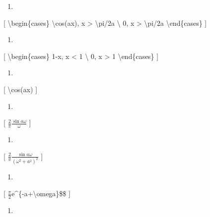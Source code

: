 \documentclass[
]{article}
\providecommand{\tightlist}{%
  \setlength{\itemsep}{0pt}\setlength{\parskip}{0pt}}
\begin{document}
{{{\begin{enumerate}
\def\labelenumi{\arabic{enumi}.}
\setcounter{enumi}{16}
\tightlist
\item
\end{enumerate}

{[} \textbackslash begin\{cases\} \textbackslash cos(ax),
\textbar x\textbar{} \textgreater{} \textbackslash pi/2a
\textbackslash{} 0, \textbar x\textbar{} \textgreater{}
\textbackslash pi/2a \textbackslash end\{cases\} {]}

\begin{enumerate}
\def\labelenumi{\arabic{enumi}.}
\setcounter{enumi}{17}
\tightlist
\item
\end{enumerate}

{[} \textbackslash begin\{cases\} 1-\textbar x\textbar,
\textbar x\textbar{} \textless{} 1 \textbackslash{} 0,
\textbar x\textbar{} \textgreater{} 1 \textbackslash end\{cases\} {]}

\begin{enumerate}
\def\labelenumi{\arabic{enumi}.}
\setcounter{enumi}{18}
\tightlist
\item
\end{enumerate}

{[} \textbackslash cos(ax) {]}

\begin{enumerate}
\def\labelenumi{\arabic{enumi}.}
\setcounter{enumi}{9}
\tightlist
\item
\end{enumerate}

{[} \(\frac{2}{\pi} \frac{\sin a\omega}{\omega}\) {]}

\begin{enumerate}
\def\labelenumi{\arabic{enumi}.}
\setcounter{enumi}{9}
\tightlist
\item
\end{enumerate}

{[} \(\frac{2}{\pi} \frac{\sin a\omega}{(\omega^2+a^2)^2}\) {]}

\begin{enumerate}
\def\labelenumi{\arabic{enumi}.}
\setcounter{enumi}{10}
\tightlist
\item
\end{enumerate}

{[} \(\frac{\pi}{2}\)e\^{}\{-a+\textbackslash omega\}\$\$ {]}

\begin{enumerate}
\def\labelenumi{\arabic{enumi}.}
\setcounter{enumi}{11}
\tightlist
\item
\end{enumerate}

}}}
\end{document}
